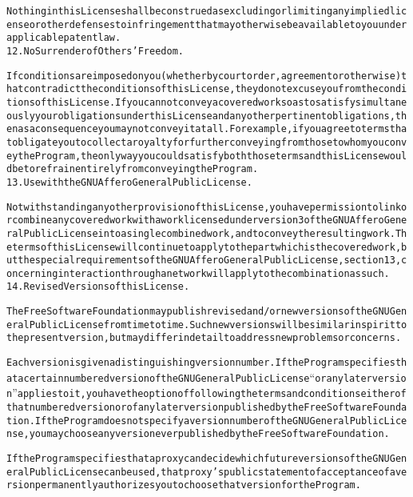 \begin{alltt}
Nothing in this License shall be construed as excluding or limiting any implied license or other defenses to infringement that may otherwise be available to you under applicable patent law.
12. No Surrender of Others' Freedom.

If conditions are imposed on you (whether by court order, agreement or otherwise) that contradict the conditions of this License, they do not excuse you from the conditions of this License. If you cannot convey a covered work so as to satisfy simultaneously your obligations under this License and any other pertinent obligations, then as a consequence you may not convey it at all. For example, if you agree to terms that obligate you to collect a royalty for further conveying from those to whom you convey the Program, the only way you could satisfy both those terms and this License would be to refrain entirely from conveying the Program.
13. Use with the GNU Affero General Public License.

Notwithstanding any other provision of this License, you have permission to link or combine any covered work with a work licensed under version 3 of the GNU Affero General Public License into a single combined work, and to convey the resulting work. The terms of this License will continue to apply to the part which is the covered work, but the special requirements of the GNU Affero General Public License, section 13, concerning interaction through a network will apply to the combination as such.
14. Revised Versions of this License.

The Free Software Foundation may publish revised and/or new versions of the GNU General Public License from time to time. Such new versions will be similar in spirit to the present version, but may differ in detail to address new problems or concerns.

Each version is given a distinguishing version number. If the Program specifies that a certain numbered version of the GNU General Public License “or any later version” applies to it, you have the option of following the terms and conditions either of that numbered version or of any later version published by the Free Software Foundation. If the Program does not specify a version number of the GNU General Public License, you may choose any version ever published by the Free Software Foundation.

If the Program specifies that a proxy can decide which future versions of the GNU General Public License can be used, that proxy's public statement of acceptance of a version permanently authorizes you to choose that version for the Program.


\end{alltt}
